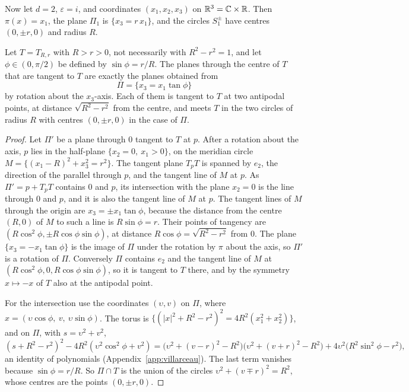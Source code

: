 Now let $d=2$, $\varepsilon=i$, and coordinates $(x_1,x_2,x_3)$ on $\mathbb{R}^3=\mathbb{C}\times\mathbb{R}$. Then $\pi(x)=x_1$, the plane $\Pi_1$ is $\{x_3=r\,x_1\}$, and the circles $S_1^\pm$ have centres $(0,\pm r,0)$ and radius $R$.

\begin{proposition}\label{prop:bitangent}
Let $T=T_{R,r}$ with $R>r>0$, not necessarily with $R^2-r^2=1$, and let $\phi\in(0,\pi/2)$ be defined by $\sin\phi=r/R$. The planes through the centre of $T$ that are tangent to $T$ are exactly the planes obtained from
\[
\Pi=\{x_3=x_1\tan\phi\}
\]
by rotation about the $x_3$-axis. Each of them is tangent to $T$ at two antipodal points, at distance $\sqrt{R^2-r^2}$ from the centre, and meets $T$ in the two circles of radius $R$ with centres $(0,\pm r,0)$ in the case of $\Pi$.
\end{proposition}

\begin{proof}
Let $\Pi'$ be a plane through $0$ tangent to $T$ at $p$. After a rotation about the axis, $p$ lies in the half-plane $\{x_2=0,\ x_1>0\}$, on the meridian circle $M=\{(x_1-R)^2+x_3^2=r^2\}$. The tangent plane $T_pT$ is spanned by $e_2$, the direction of the parallel through $p$, and the tangent line of $M$ at $p$. As $\Pi'=p+T_pT$ contains $0$ and $p$, its intersection with the plane $x_2=0$ is the line through $0$ and $p$, and it is also the tangent line of $M$ at $p$. The tangent lines of $M$ through the origin are $x_3=\pm x_1\tan\phi$, because the distance from the centre $(R,0)$ of $M$ to such a line is $R\sin\phi=r$. Their points of tangency are $(R\cos^2\phi,\pm R\cos\phi\sin\phi)$, at distance $R\cos\phi=\sqrt{R^2-r^2}$ from $0$. The plane $\{x_3=-x_1\tan\phi\}$ is the image of $\Pi$ under the rotation by $\pi$ about the axis, so $\Pi'$ is a rotation of $\Pi$. Conversely $\Pi$ contains $e_2$ and the tangent line of $M$ at $(R\cos^2\phi,0,R\cos\phi\sin\phi)$, so it is tangent to $T$ there, and by the symmetry $x\mapsto-x$ of $T$ also at the antipodal point.

For the intersection use the coordinates $(\upsilon,v)$ on $\Pi$, where $x=(\upsilon\cos\phi,\ v,\ \upsilon\sin\phi)$. The torus is $\{(|x|^2+R^2-r^2)^2=4R^2(x_1^2+x_2^2)\}$, and on $\Pi$, with $s=\upsilon^2+v^2$,
\[
(s+R^2-r^2)^2-4R^2(\upsilon^2\cos^2\phi+v^2)
=\bigl(\upsilon^2+(v-r)^2-R^2\bigr)\bigl(\upsilon^2+(v+r)^2-R^2\bigr)+4\upsilon^2\bigl(R^2\sin^2\phi-r^2\bigr),
\]
an identity of polynomials (Appendix~\ref{app:villarceau}). The last term vanishes because $\sin\phi=r/R$. So $\Pi\cap T$ is the union of the circles $\upsilon^2+(v\mp r)^2=R^2$, whose centres are the points $(0,\pm r,0)$.
\end{proof}

